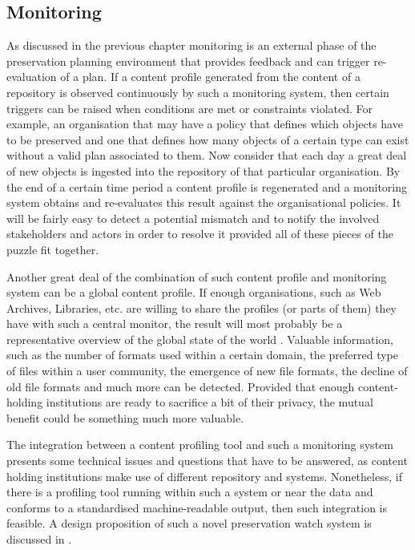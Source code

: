 \subsection{Monitoring}
As discussed in the previous chapter monitoring is an external phase of the preservation planning environment that provides feedback and can trigger re-evaluation of a plan. If a content profile generated from the content of a repository is observed continuously by such a monitoring system, then certain triggers can be raised when conditions are met or constraints violated.
For example, an organisation that may have a policy that defines which objects have to be preserved and one that defines how many objects of a certain type can exist without a valid plan associated to them. Now consider that each day a great deal of new objects is ingested into the repository of that particular organisation. By the end of a certain time period a content profile is regenerated and a monitoring system obtains and re-evaluates this result against the organisational policies. It will be fairly easy to detect a potential mismatch and to notify the involved stakeholders and actors in order to resolve it provided all of these pieces of the puzzle fit together.

Another great deal of the combination of such content profile and monitoring system can be a global content profile. If enough organisations, such as Web Archives, Libraries, etc. are willing to share the profiles (or parts of them) they have with such a central monitor, the result will most probably be a representative overview of the global state of the world \cite{becker-ipres2012}. Valuable information, such as the number of formats used within a certain domain, the preferred type of files within a user community, the emergence of new file formats, the decline of old file formats and much more can be detected. Provided that enough content-holding institutions are ready to sacrifice a bit of their privacy, the mutual benefit could be something much more valuable.

The integration between a content profiling tool and such a monitoring system presents some technical issues and questions that have to be answered, as content holding institutions make use of different repository and systems. Nonetheless, if there is a profiling tool running within such a system or near the data and conforms to a standardised machine-readable output, then such integration is feasible. A design proposition of such a novel preservation watch system is discussed in \cite{duretec:2012:watch, FariaPDBFR12}.


